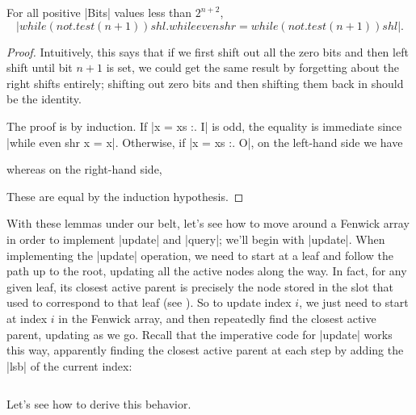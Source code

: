 \begin{lem} \label{lem:shlshr}
  For all positive |Bits| values less than $2^{n+2}$,
  \[ |while (not . test (n+1)) shl . while even shr = while (not . test (n+1)) shl|. \]
\end{lem}
\begin{proof}
  Intuitively, this says that if we first shift out all the zero bits
  and then left shift until bit $n+1$ is set, we could get the same
  result by forgetting about the right shifts entirely; shifting out
  zero bits and then shifting them back in should be the identity.

  The proof is by induction.  If |x = xs :. I| is odd, the equality is
  immediate since |while even shr x = x|. Otherwise, if |x = xs :. O|,
  on the left-hand side we have
  \begin{sproof}
  \end{sproof}
  whereas on the right-hand side,
  \begin{sproof}
  \end{sproof}
  These are equal by the induction hypothesis.
\end{proof}

With these lemmas under our belt, let's see how to move around a
Fenwick array in order to implement |update| and |query|; we'll begin
with |update|. When implementing the |update| operation, we need to start at a leaf
and follow the path up to the root, updating all the active nodes
along the way.  In fact, for any given leaf, its closest active parent
is precisely the node stored in the slot that used to correspond to
that leaf (see ).  So to update index $i$, we
just need to start at index $i$ in the Fenwick array, and then
repeatedly find the closest active parent, updating as we go.  Recall
that the imperative code for |update| works this way, apparently
finding the closest active parent at each step by adding the |lsb| of
the current index:
\inputminted[fontsize=\footnotesize,firstline=8,lastline=10]{java}{FenwickTree.java}
\noindent
Let's see how to derive this behavior.

